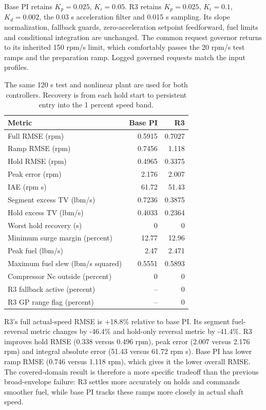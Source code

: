 \documentclass[11pt,a4paper]{article}
\begin{document}
Base PI retains $K_p=0.025$, $K_i=0.05$. R3 retains $K_p=0.025$, $K_i=0.1$, $K_d=0.002$, the 0.03 s acceleration filter and 0.015 s sampling. Its slope normalization, fallback guards, zero-acceleration setpoint feedforward, fuel limits and conditional integration are unchanged. The common request governor returns to its inherited 150 rpm/s limit, which comfortably passes the 20 rpm/s test ramps and the preparation ramp. Logged governed requests match the input profiles.
\begin{table}[H]\centering\small\begin{tabular}{lrr}\toprule
Metric & Base PI & R3\\\midrule
Full RMSE (rpm) & 0.5915 & 0.7027\\
Ramp RMSE (rpm) & 0.7456 & 1.118\\
Hold RMSE (rpm) & 0.4965 & 0.3375\\
Peak error (rpm) & 2.176 & 2.007\\
IAE (rpm s) & 61.72 & 51.43\\
Segment excess TV (lbm/s) & 0.7236 & 0.3875\\
Hold excess TV (lbm/s) & 0.4033 & 0.2364\\
Worst hold recovery (s) & 0 & 0\\
Minimum surge margin (percent) & 12.77 & 12.96\\
Peak fuel (lbm/s) & 2.47 & 2.471\\
Maximum fuel slew (lbm/s squared) & 0.5551 & 0.5893\\
Compressor Nc outside (percent) & 0 & 0\\
R3 fallback active (percent) & -- & 0\\
R3 GP range flag (percent) & -- & 0\\
\bottomrule\end{tabular}\caption{The same 120 s test and nonlinear plant are used for both controllers. Recovery is from each hold start to persistent entry into the 1 percent speed band.}\end{table}
R3's full actual-speed RMSE is +18.8\% relative to base PI. Its segment fuel-reversal metric changes by -46.4\% and hold-only reversal metric by -41.4\%.
R3 improves hold RMSE (0.338 versus 0.496 rpm), peak error (2.007 versus 2.176 rpm) and integral absolute error (51.43 versus 61.72 rpm s). Base PI has lower ramp RMSE (0.746 versus 1.118 rpm), which gives it the lower overall RMSE. The covered-domain result is therefore a more specific tradeoff than the previous broad-envelope failure: R3 settles more accurately on holds and commands smoother fuel, while base PI tracks these ramps more closely in actual shaft speed.
\clearpage
\end{document}
